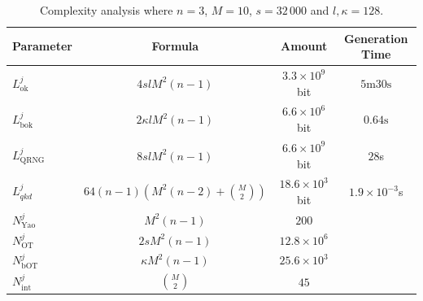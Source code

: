 \begin{table}[t]
\centering
\begin{tabular}{lccc}
\toprule
Parameter & Formula & Amount & Generation Time \\ 
\midrule
$L^j_{\text{ok}}$ & $4slM^2(n-1)$ & $3.3 \times 10^9$ bit & $5\text{m}30\text{s}$ \\ 
$L^j_{\text{bok}}$ & $2\kappa lM^2(n-1)$ & $6.6 \times 10^6$ bit & $0.64\text{s}$ \\ 
$L^j_{\text{QRNG}}$ & $8slM^2(n-1)$ & $6.6 \times 10^9$ bit & $28$s \\ 
$L^{j}_{qkd}$ & $64(n-1)(M^2(n-2) + \binom{M}{2})$ & $18.6 \times 10^3$ bit & $1.9\times 10^{-3}$s \\
$N^j_{\text{Yao}}$ & $M^2(n-1)$ & $200$ &  \\ 
$N^j_{\text{OT}}$ & $2sM^2(n-1)$ & $12.8 \times 10^6$ &  \\ 
$N^j_{\text{bOT}}$ & $\kappa M^2(n-1)$ & $25.6 \times 10^3$ &  \\
$N^j_{\text{int}}$ & $\binom{M}{2}$ & $45$ &  \\ 
\bottomrule
\end{tabular}
\caption{Complexity analysis where $n=3$, $M=10$, $s=32\,000$ and $l, \kappa=128$.}
\label{table:complexity}
\end{table}


%
%
%
